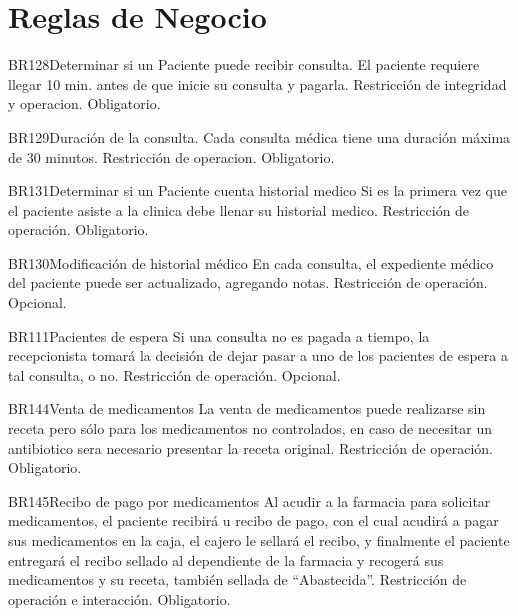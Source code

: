 
\section{Reglas de Negocio}

\begin{BussinesRule}{BR128}{Determinar si un Paciente puede recibir consulta.} 
	\BRitem[Descripción:] El paciente requiere llegar 10 min. antes de que inicie su consulta y pagarla.
	\BRitem[Tipo:] Restricción de integridad y operacion.
	\BRitem[Nivel:] Obligatorio.
\end{BussinesRule}
\begin{BussinesRule}{BR129}{Duraci\'on de la consulta.} 
	\BRitem[Descripción:] Cada consulta m\'edica tiene una duraci\'on m\'axima de 30 minutos.
	\BRitem[Tipo:] Restricción de operacion.
	\BRitem[Nivel:] Obligatorio.
\end{BussinesRule}

\begin{BussinesRule}{BR131}{Determinar si un Paciente cuenta historial medico}
	\BRitem[Descripción:] Si es la primera vez que el paciente asiste a la clinica debe llenar su historial medico.
	\BRitem[Tipo:] Restricción de operación.
	\BRitem[Nivel:] Obligatorio.
\end{BussinesRule}
\begin{BussinesRule}{BR130}{Modificaci\'on de historial m\'edico}
	\BRitem[Descripción:] En cada consulta, el expediente m\'edico del paciente puede ser actualizado, agregando notas.
	\BRitem[Tipo:] Restricción de operación.
	\BRitem[Nivel:] Opcional.
\end{BussinesRule}
\begin{BussinesRule}{BR111}{Pacientes de espera}
	\BRitem[Descripción:] Si una consulta no es pagada a tiempo, la recepcionista tomar\'a la decisi\'on de dejar pasar a uno de los pacientes de espera a tal consulta, o no.
	\BRitem[Tipo:] Restricción de operación.
	\BRitem[Nivel:] Opcional.
\end{BussinesRule}

\begin{BussinesRule}{BR144}{Venta de medicamentos}
	\BRitem[Descripción:] La venta de medicamentos puede realizarse sin receta pero s\'olo para los medicamentos no controlados, en caso de necesitar un antibiotico sera necesario presentar la receta original.
	\BRitem[Tipo:] Restricción de operación.
	\BRitem[Nivel:] Obligatorio.
\end{BussinesRule}
\begin{BussinesRule}{BR145}{Recibo de pago por medicamentos}
	\BRitem[Descripción:] Al acudir a la farmacia para solicitar medicamentos, el paciente recibir\'a u recibo de pago, con el cual acudir\'a a pagar sus medicamentos en la caja, el cajero le sellar\'a el recibo, y finalmente el paciente entregar\'a el recibo sellado al dependiente de la farmacia y recoger\'a sus medicamentos y su receta, tambi\'en sellada de "`Abastecida"'.
	\BRitem[Tipo:] Restricción de operación e interacci\'on.
	\BRitem[Nivel:] Obligatorio.
\end{BussinesRule}

